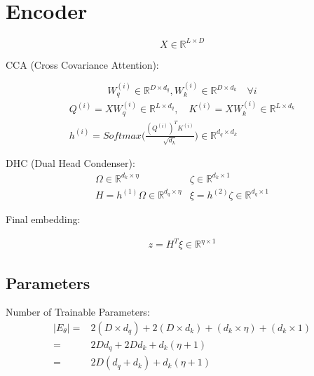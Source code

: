 \documentclass{article}
\begin{document}
\section{Encoder}

\begin{equation}
	X \in \mathbb{R}^{L \times D}
\end{equation}


CCA (Cross Covariance Attention): 

\begin{equation}
W_{q}^{(i)} \in \mathbb{R}^{D \times d_q}, W_{k}^{(i)} \in \mathbb{R}^{D \times d_k} \quad \forall i
\end{equation}
\begin{eqnarray}
Q^{(i)} = X W_q^{(i)} \in \mathbb{R}^{L \times d_q}, \quad K^{(i)} = X  W_k^{(i)} \in \mathbb{R}^{L \times d_k} \\
h^{(i)} = \textit{Softmax}\Bigg(\frac{(Q^{(i)})^T K^{(i)}}{\sqrt{d_{k}}}\Bigg) \in \mathbb{R}^{d_q \times d_k}
\end{eqnarray}

DHC (Dual Head Condenser):
\begin{eqnarray}
\Omega \in \mathbb{R}^{d_k \times \eta} & \zeta \in \mathbb{R}^{d_k \times 1} \\
H = h^{(1)} \Omega \in \mathbb{R}^{d_q \times \eta} & \xi = h^{(2)} \zeta \in \mathbb{R}^{d_q \times 1}
\end{eqnarray}

Final embedding:

\begin{eqnarray}
z = H^T \xi \in \mathbb{R}^{\eta \times 1}
\end{eqnarray}
\subsection{Parameters}
Number of Trainable Parameters:
\begin{eqnarray*}
\vert E_{\theta} \vert =& 2(D \times d_q) + 2(D \times d_k) + (d_k \times \eta) + (d_k \times 1) \\
=& 2Dd_{q}+2Dd_{k}+d_{k}(\eta + 1) \\
=& 2D(d_q + d_k)+d_{k}(\eta + 1)
\end{eqnarray*}
\end{document}

